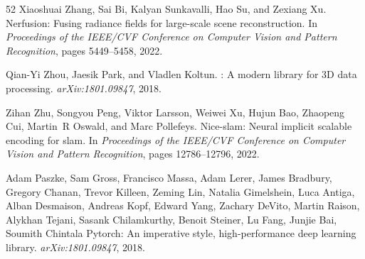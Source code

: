 \documentclass[10pt,twocolumn,letterpaper]{article}
\begin{document}
{\begin{thebibliography}{52}
Xiaoshuai Zhang, Sai Bi, Kalyan Sunkavalli, Hao Su, and Zexiang Xu.
\newblock Nerfusion: Fusing radiance fields for large-scale scene reconstruction.
\newblock In \emph{Proceedings of the IEEE/CVF Conference on Computer Vision and Pattern Recognition}, pages 5449--5458, 2022.

Qian-Yi Zhou, Jaesik Park, and Vladlen Koltun.
: {A} modern library for {3D} data processing.
\newblock \emph{arXiv:1801.09847}, 2018.

Zihan Zhu, Songyou Peng, Viktor Larsson, Weiwei Xu, Hujun Bao, Zhaopeng Cui, Martin~R Oswald, and Marc Pollefeys.
\newblock Nice-slam: Neural implicit scalable encoding for slam.
\newblock In \emph{Proceedings of the IEEE/CVF Conference on Computer Vision and Pattern Recognition}, pages 12786--12796, 2022.

Adam Paszke, Sam Gross, Francisco Massa, Adam Lerer, James Bradbury, Gregory Chanan, Trevor Killeen, Zeming Lin, Natalia Gimelshein, Luca Antiga, Alban Desmaison, Andreas Kopf, Edward Yang, Zachary DeVito, Martin Raison, Alykhan Tejani, Sasank Chilamkurthy, Benoit Steiner, Lu Fang, Junjie Bai, Soumith Chintala
\newblock Pytorch: An imperative style, high-performance deep learning library.
\newblock \emph{arXiv:1801.09847}, 2018.


\end{thebibliography}

}




\end{document}
